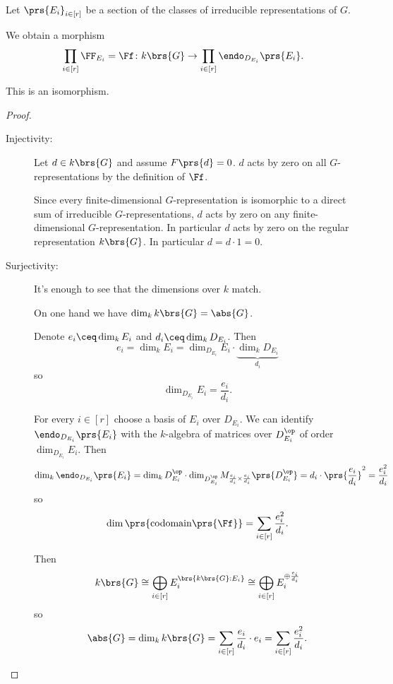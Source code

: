 \documentclass[10pt,a4paper,twoside,openany,hidelinks]{book}
\begin{document}
\begin{proposition}
Let $\prs{E_i}_{i \in [r]}$ be a section of the classes of irreducible representations of $G$.

We obtain a morphism
\[\prod_{i \in [r]} \FF_{E_i} = \Ff \colon k\brs{G} \to \prod_{i \in [r]} \endo_{D_{E_i}}\prs{E_i} \text{.}\]

This is an isomorphism.
\end{proposition}


\begin{proof}
\begin{description}
\item[Injectivity:]
Let $d \in k\brs{G}$ and assume $F\prs{d} = 0$.
$d$ acts by zero on all $G$-representations by the definition of $\Ff$.

Since every finite-dimensional $G$-representation is isomorphic to a direct sum of irreducible $G$-representations, $d$ acts by zero on any finite-dimensional $G$-representation.
In particular $d$ acts by zero on the regular representation $k\brs{G}$. In particular $d = d \cdot 1 = 0$.

\item[Surjectivity:]
It's enough to see that the dimensions over $k$ match.

On one hand we have $\dim_k k\brs{G} = \abs{G}$.

Denote $e_i \ceq \dim_k E_i$ and $d_i \ceq \dim_k D_{E_i}$.
Then
\[e_i = \dim_k E_i = \dim_{D_{E_i}} E_i \cdot \underset{d_i}{\underbrace{\dim_k D_{E_i}}}\]
so
\[\dim_{D_{E_i}} E_i = \frac{e_i}{d_i} \text{.}\]

For every $i \in [r]$ choose a basis of $E_i$ over $D_{E_i}$. We can identify $\endo_{D_{E_i}} \prs{E_i}$ with the $k$-algebra of matrices over $D_{E_i}^\op$ of order $\dim_{D_{E_i}} E_i$.
Then
\[\dim_k \endo_{D_{E_i}}\prs{E_i} = \dim_k D_{E_i}^\op \cdot \dim_{D_{E_i}^\op} M_{\frac{e_i}{d_i} \times \frac{e_i}{d_i}}\prs{D_{E_i}^\op} = d_i \cdot \prs{\frac{e_i}{d_i}}^2 = \frac{e_i^2}{d_i}\]
so
\[\dim\prs{\mathrm{codomain}\prs{\Ff}} = \sum_{i \in [r]} \frac{e_i^2}{d_i} \text{.}\]

Then
\[k\brs{G} \cong \bigoplus_{i \in [r]} E_i^{\brs{k\brs{G} : E_i}} \cong \bigoplus_{i \in [r]} E_i^{\oplus \frac{e_i}{d_i}}\]
so
\[\abs{G} = \dim_k k\brs{G} = \sum_{i \in [r]} \frac{e_i}{d_i} \cdot e_i = \sum_{i \in [r]} \frac{e_i^2}{d_i} \text{.}\]
\end{description}
\end{proof}
\end{document}
